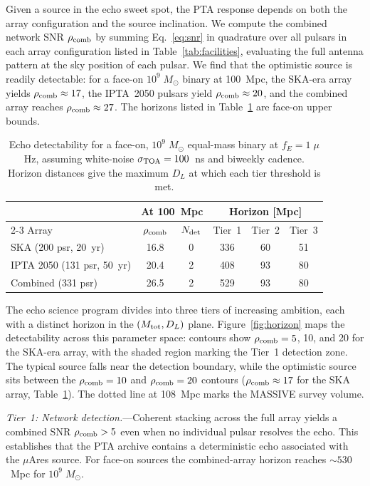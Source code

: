 \documentclass[aps,prx,twocolumn,superscriptaddress,nofootinbib,longbibliography]{revtex4-2}
\newcommand{\Msun}{M_\odot}
\begin{document}
Given a source in the echo sweet spot, the PTA response depends on both the array configuration and the source inclination. We compute the combined network SNR $\rho_{\rm comb}$ by summing Eq.~\eqref{eq:snr} in quadrature over all pulsars in each array configuration listed in Table~\ref{tab:facilities}, evaluating the full antenna pattern at the sky position of each pulsar. We find that the optimistic source is readily detectable: for a face-on $10^9\;\Msun$ binary at 100~Mpc, the SKA-era array yields $\rho_{\rm comb}\approx17$, the IPTA~2050 pulsars yield $\rho_{\rm comb}\approx20$, and the combined array reaches $\rho_{\rm comb}\approx27$. The horizons listed in Table~\ref{tab:horizon} are face-on upper bounds.

\begin{table}[t]
\caption{Echo detectability for a face-on, $10^9\;\Msun$ equal-mass binary at $f_E = 1\;\mu$Hz, assuming white-noise $\sigma_{\rm TOA} = 100$~ns and biweekly cadence. Horizon distances give the maximum $D_L$ at which each tier threshold is met.}
\label{tab:horizon}
\centering
\begin{tabular}{lccccc}
\hline\hline
 & \multicolumn{2}{c}{At 100~Mpc} & \multicolumn{3}{c}{Horizon [Mpc]} \\
\cline{2-3}\cline{4-6}
Array & $\rho_{\rm comb}$ & $N_{\rm det}$ & Tier~1 & Tier~2 & Tier~3 \\
\hline
SKA (200 psr, 20~yr)        & 16.8 &  0 & 336 &  60 &  51 \\
IPTA 2050 (131 psr, 50~yr)  & 20.4 &  2 & 408 &  93 &  80 \\
Combined (331 psr)          & 26.5 &  2 & 529 &  93 &  80 \\
\hline\hline
\end{tabular}
\end{table}

The echo science program divides into three tiers of increasing ambition, each with a distinct horizon in the $(M_{\rm tot},D_L)$ plane. Figure~\ref{fig:horizon} maps the detectability across this parameter space: contours show $\rho_{\rm comb}=5$, 10, and 20 for the SKA-era array, with the shaded region marking the Tier~1 detection zone. The typical source falls near the detection boundary, while the optimistic source sits between the $\rho_{\rm comb}=10$ and $\rho_{\rm comb}=20$ contours ($\rho_{\rm comb}\approx17$ for the SKA array, Table~\ref{tab:horizon}). The dotted line at 108~Mpc marks the MASSIVE survey volume.

\textit{Tier~1: Network detection.}---Coherent stacking across the full array yields a combined SNR $\rho_{\rm comb}>5$ even when no individual pulsar resolves the echo. This establishes that the PTA archive contains a deterministic echo associated with the $\mu$Ares source. For face-on sources the combined-array horizon reaches $\sim530$~Mpc for $10^9\;\Msun$.
\end{document}
